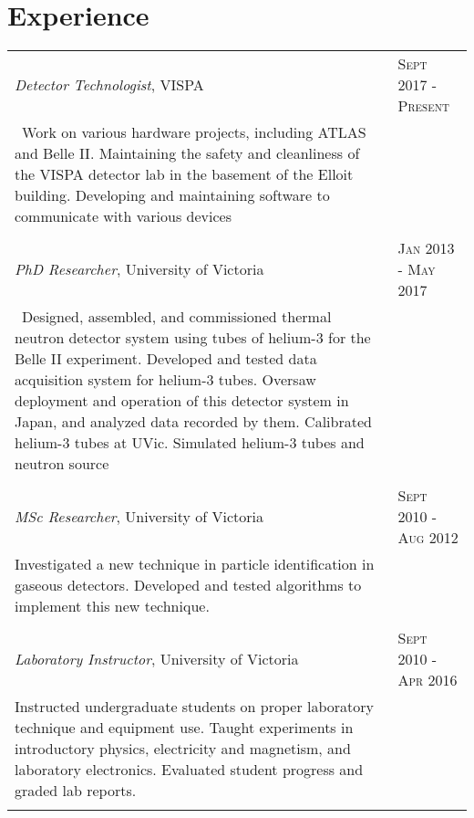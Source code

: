 \documentclass{article}
\begin{document}
\section{Experience}
\begin{tabular}{p{14cm}l}

\textit{Detector Technologist}, VISPA & \textsc{Sept 2017 - Present} \\
	 \	 \footnotesize{Work on various hardware projects, including ATLAS and Belle II. Maintaining the safety and cleanliness of the VISPA detector lab in the basement of the Elloit building. Developing and maintaining software to communicate with various devices }&\\
&\\

 \textit{PhD Researcher}, University of Victoria & \textsc{Jan 2013 - May 2017} \\
	 \	 \footnotesize{Designed, assembled, and commissioned thermal neutron detector system using tubes of helium-3 for the Belle II experiment. Developed and tested data acquisition system for helium-3 tubes. Oversaw deployment and operation of this detector system in Japan, and analyzed data recorded by them. Calibrated helium-3 tubes at UVic. Simulated helium-3 tubes and neutron source}&\\
&\\

  \textit{MSc Researcher}, University of Victoria & \textsc{Sept 2010 - Aug 2012}\\
	 \footnotesize{Investigated a new technique in particle identification in gaseous detectors. Developed and tested algorithms to implement this new technique.}&\\
&\\

  \textit{Laboratory Instructor}, University of Victoria & \textsc{Sept 2010 - Apr 2016}\\
	 \footnotesize{Instructed undergraduate students on proper laboratory technique and equipment use. Taught experiments in introductory physics, electricity and magnetism, and laboratory electronics. Evaluated student progress and graded lab reports.}&\\
&\\



\end{tabular}
\end{document}
